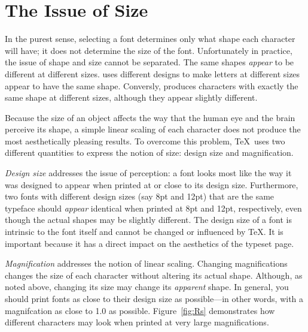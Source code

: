 \section{The Issue of Size}
\label{sec:issueofsize}

In the purest sense, selecting a font determines only 
what shape each 
character will have; it does not determine the 
size of the font.
Unfortunately in practice, the issue of shape and size cannot be
separated.  The same shapes {\em appear\/} to be different at different
sizes.  
uses different designs to
make letters at different sizes appear to have the same shape.
Conversly,  produces 
characters with
exactly the same shape at different sizes, although they appear
slightly different.

%
%

Because the size of an object affects the way that the human eye and
the brain perceive its shape, a simple linear scaling of each
character does not produce the most aesthetically pleasing results.
To overcome this problem, \TeX\ uses two different quantities to
express the notion of size: design size and magnification.

{\em Design size\/}
addresses the issue of perception: a font looks most like
the way it was designed to appear when printed at or close to its
design size.  Furthermore, two fonts with different design sizes (say
8pt and 12pt) that are the same typeface should {\em appear\/}
identical when printed at 8pt and 12pt, respectively, even though the
actual shapes may be slightly different.  The design size of a font is
intrinsic to the font itself and cannot be changed or influenced by
\TeX.  It is important because it has a direct impact on the aesthetics
of the typeset page.

{\em Magnification\/} addresses the 
notion of linear scaling.  Changing 
magnifications
changes the size of each character without altering its actual shape.
Although, as noted above, changing its size may change its {\em apparent\/}
shape.  In general, you should print fonts as close to their design
size as possible---in other words, with a magnifcation as close to 1.0 as
possible.  Figure~\ref{fig:Rs} demonstrates how different characters
may look when printed at very large magnifications.  
%

